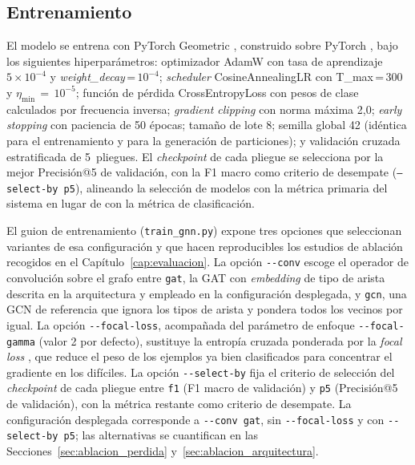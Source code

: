 \subsection{Entrenamiento}

El modelo se entrena con PyTorch Geometric \citep{Fey2019}, construido
sobre PyTorch \citep{Paszke2019}, bajo los siguientes hiperparámetros: optimizador AdamW con tasa de aprendizaje
\(5\times10^{-4}\) y \textit{weight\_decay}\,=\,\(10^{-4}\);
\textit{scheduler} CosineAnnealingLR con T\_max\,=\,300 y
\(\eta_{\min}\,=\,10^{-5}\); función de pérdida CrossEntropyLoss con pesos
de clase calculados por frecuencia inversa;
\textit{gradient clipping} con norma máxima 2,0; \textit{early stopping} con
paciencia de 50 épocas; tamaño de lote 8; semilla global 42 (idéntica para el
entrenamiento y para la generación de particiones); y validación cruzada
estratificada de 5~pliegues. El \textit{checkpoint} de cada pliegue se selecciona
por la mejor Precisión@5 de validación, con la F1 macro como criterio de
desempate (\texttt{--select-by p5}), alineando la selección de modelos con la
métrica primaria del sistema en lugar de con la métrica de clasificación.

El guion de entrenamiento (\texttt{train\_gnn.py}) expone tres opciones que
seleccionan variantes de esa configuración y que hacen reproducibles los estudios
de ablación recogidos en el Capítulo~\ref{cap:evaluacion}. La opción
\texttt{-{}-conv} escoge el operador de convolución sobre el grafo entre
\texttt{gat}, la \ac{GAT} con \textit{embedding} de tipo de arista descrita en la
arquitectura y empleado en la configuración desplegada, y \texttt{gcn}, una
\ac{GCN} de referencia que ignora los tipos de arista y pondera todos los vecinos
por igual. La opción \texttt{-{}-focal-loss}, acompañada del parámetro de enfoque
\texttt{-{}-focal-gamma} (valor 2 por defecto), sustituye la entropía cruzada
ponderada por la \textit{focal loss} \citep{Lin2017}, que reduce el peso de los
ejemplos ya bien clasificados para concentrar el gradiente en los difíciles. La
opción \texttt{-{}-select-by} fija el criterio de selección del \textit{checkpoint}
de cada pliegue entre \texttt{f1} (F1 macro de validación) y \texttt{p5}
(Precisión@5 de validación), con la métrica restante como criterio de desempate.
La configuración desplegada corresponde a \texttt{-{}-conv gat}, sin
\texttt{-{}-focal-loss} y con \texttt{-{}-select-by p5}; las alternativas se
cuantifican en las Secciones~\ref{sec:ablacion_perdida}
y~\ref{sec:ablacion_arquitectura}.

